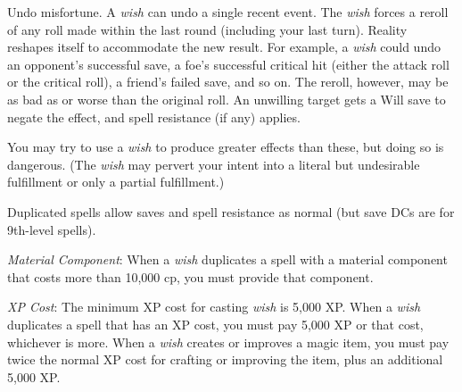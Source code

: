 {\begin{itemize*}
	\item Undo misfortune. A \emph{wish} can undo a single recent event. The \emph{wish} forces a reroll of any roll made within the last round (including your last turn). Reality reshapes itself to accommodate the new result. For example, a \emph{wish} could undo an opponent's successful save, a foe's successful critical hit (either the attack roll or the critical roll), a friend's failed save, and so on. The reroll, however, may be as bad as or worse than the original roll. An unwilling target gets a Will save to negate the effect, and spell resistance (if any) applies.
	\end{itemize*}

	You may try to use a \emph{wish} to produce greater effects than these, but doing so is dangerous. (The \emph{wish} may pervert your intent into a literal but undesirable fulfillment or only a partial fulfillment.)

	Duplicated spells allow saves and spell resistance as normal (but save DCs are for 9th-level spells).

	\textit{Material Component}:
	When a \emph{wish} duplicates a spell with a material component that costs more than 10,000 cp, you must provide that component.

	\textit{XP Cost}:
	The minimum XP cost for casting \emph{wish} is 5,000 XP. When a \emph{wish} duplicates a spell that has an XP cost, you must pay 5,000 XP or that cost, whichever is more. When a \emph{wish} creates or improves a magic item, you must pay twice the normal XP cost for crafting or improving the item, plus an additional 5,000 XP.

}
